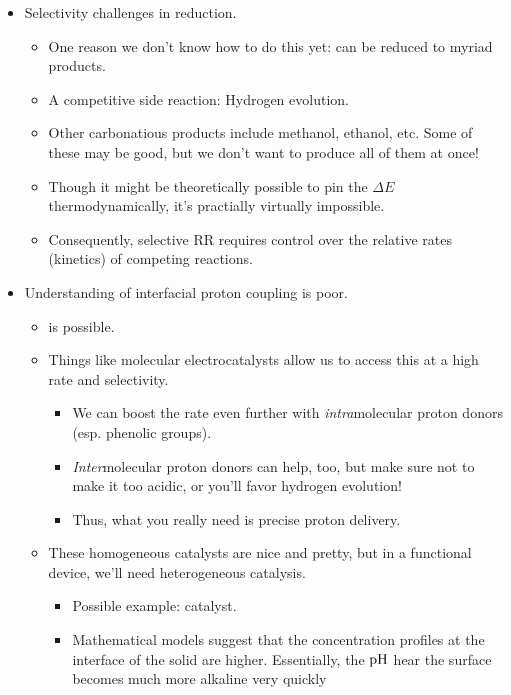 \documentclass[../notes.tex]{subfiles}
\begin{document}
\begin{itemize}
\begin{itemize}
    \end{itemize}
    \item Selectivity challenges in  reduction.
    \begin{itemize}
        \item One reason we don't know how to do this yet:  can be reduced to myriad products.
        \item A competitive side reaction: Hydrogen evolution.
        \item Other carbonatious products include methanol, ethanol, etc. Some of these may be good, but we don't want to produce all of them at once!
        \item Though it might be theoretically possible to pin the $\Delta E$ thermodynamically, it's practially virtually impossible.
        \item Consequently, selective RR requires control over the relative rates (kinetics) of competing reactions.
    \end{itemize}
    \item Understanding of interfacial proton coupling is poor.
    \begin{itemize}
        \item {} is possible.
        \item Things like molecular electrocatalysts allow us to access this at a high rate and selectivity.
        \begin{itemize}
            \item We can boost the rate even further with \emph{intra}molecular proton donors (esp. phenolic groups).
            \item \emph{Inter}molecular proton donors can help, too, but make sure not to make it too acidic, or you'll favor hydrogen evolution!
            \item Thus, what you really need is precise proton delivery.
        \end{itemize}
        \item These homogeneous catalysts are nice and pretty, but in a functional device, we'll need heterogeneous catalysis.
        \begin{itemize}
            \item Possible example:  catalyst.
            \item Mathematical models suggest that the concentration profiles at the interface of the solid are higher. Essentially, the $\operatorname{pH}$ hear the surface becomes much more alkaline very quickly

\end{itemize}
\end{itemize}
\end{itemize}
\end{document}
